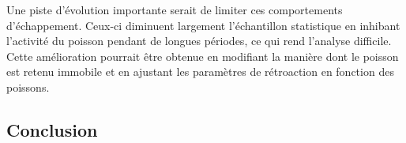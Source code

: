 Une piste d'évolution importante serait de limiter ces comportements d'échappement. 
Ceux-ci diminuent largement l'échantillon statistique en inhibant l'activité du poisson pendant de longues périodes, ce qui rend l'analyse difficile. Cette amélioration pourrait être obtenue en modifiant la manière dont le poisson est retenu immobile et en ajustant les paramètres de rétroaction en fonction des poissons. 

\subsection{Conclusion}

